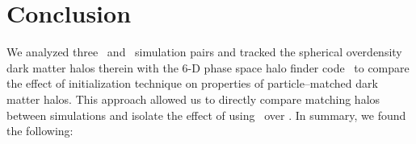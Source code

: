 
%
%

\section{Conclusion}
\label{sec:conclusion}



We analyzed three \lpt\ and \za\ simulation pairs and tracked the spherical overdensity dark matter halos therein with the 6-D phase space halo finder code \rockstar\ to compare the effect of initialization technique on properties of particle--matched dark matter halos.  This approach allowed us to directly compare matching halos between simulations and isolate the effect of using \lpt\ over \za.  In summary, we found the following:

